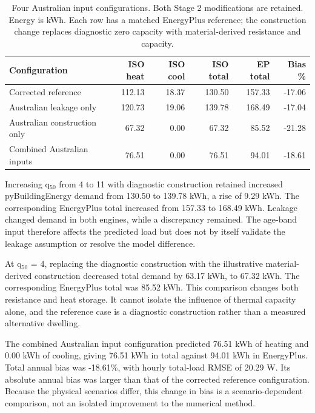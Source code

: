 \begin{table}[htbp]\centering\small

\caption{Four Australian input configurations. Both Stage 2 modifications are retained. Energy is kWh. Each row has a matched EnergyPlus reference; the construction change replaces diagnostic zero capacity with material-derived resistance and capacity.}

\begin{tabularx}{\textwidth}{@{}Xrrrrr@{}}

\toprule

Configuration & ISO heat & ISO cool & ISO total & EP total & Bias \% \\

\midrule

Corrected reference & 112.13 & 18.37 & 130.50 & 157.33 & -17.06 \\

Australian leakage only & 120.73 & 19.06 & 139.78 & 168.49 & -17.04 \\

Australian construction only & 67.32 & 0.00 & 67.32 & 85.52 & -21.28 \\

Combined Australian inputs & 76.51 & 0.00 & 76.51 & 94.01 & -18.61 \\

\bottomrule

\end{tabularx}

\end{table}

Increasing q$_{50}$ from 4 to 11 with diagnostic construction retained increased pyBuildingEnergy demand from 130.50 to 139.78 kWh, a rise of 9.29 kWh. The corresponding EnergyPlus total increased from 157.33 to 168.49 kWh. Leakage changed demand in both engines, while a discrepancy remained. The age-band input therefore affects the predicted load but does not by itself validate the leakage assumption or resolve the model difference.

At q$_{50}$ = 4, replacing the diagnostic construction with the illustrative material-derived construction decreased total demand by 63.17 kWh, to 67.32 kWh. The corresponding EnergyPlus total was 85.52 kWh. This comparison changes both resistance and heat storage. It cannot isolate the influence of thermal capacity alone, and the reference case is a diagnostic construction rather than a measured alternative dwelling.

The combined Australian input configuration predicted 76.51 kWh of heating and 0.00 kWh of cooling, giving 76.51 kWh in total against 94.01 kWh in EnergyPlus. Total annual bias was -18.61\%, with hourly total-load RMSE of 20.29 W. Its absolute annual bias was larger than that of the corrected reference configuration. Because the physical scenarios differ, this change in bias is a scenario-dependent comparison, not an isolated improvement to the numerical method.

